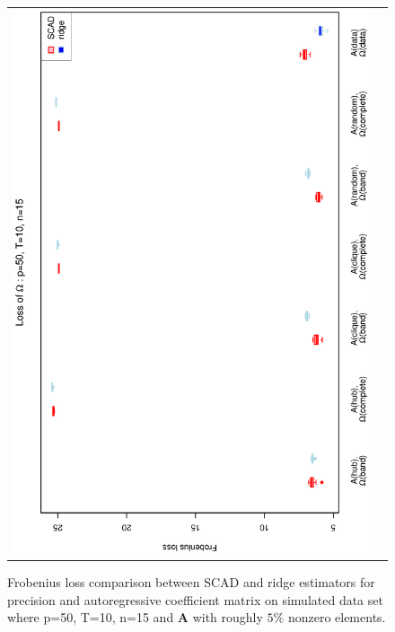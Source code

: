 \documentclass[a4paper]{article}
\begin{document}
\begin{figure}[h!]
\begin{tabular}{cc}
\includegraphics[scale=0.45,angle=270]{LossOmega50T10N15_5.eps}
\end{tabular}
\caption{Frobenius loss comparison between SCAD and ridge estimators for precision and autoregressive coefficient matrix on simulated data set where p=50, T=10, n=15  and $\mathbf{A}$ with roughly $5\%$ nonzero elements.}
\label{figSM:Loss50T10N15_5}
\end{figure}

\end{document}
